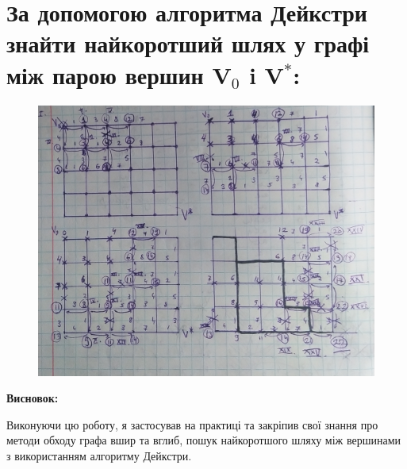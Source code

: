 \documentclass{article}
\begin{document}
{\section{За допомогою алгоритма Дейкстри знайти найкоротший шлях у графі між парою
вершин V$_0$ i V$^*$:}
\begin{figure}[h]
	\centering
	\includegraphics[width=15cm,angle=270]{lol2.png}
\end{figure}

\textbf{Висновок:}

Виконуючи цю роботу, я застосував на практиці
та закріпив свої
знання про методи обходу графа вшир та вглиб,
пошук найкоротшого шляху між вершинами з
використанням алгоритму Дейкстри.

}
\end{document}
